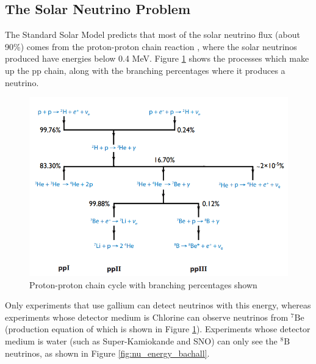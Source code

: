 \subsection{The Solar Neutrino Problem}

The Standard Solar Model predicts that most of the solar neutrino flux (about 90\%) comes from the proton-proton chain reaction \cite{borexino2018comprehensive}, where the solar neutrinos produced have energies below 0.4 MeV. Figure \ref{fig:ppchain} shows the processes which make up the pp chain, along with the branching percentages where it produces a neutrino. 

\begin{figure}
    \centering
    \includegraphics[width=\textwidth]{Figures/ppchain.png}
    \caption{Proton-proton chain cycle with branching percentages shown}
    \label{fig:ppchain}
\end{figure}

Only experiments that use gallium can detect neutrinos with this energy, whereas experiments whose detector medium is Chlorine can observe neutrinos from ${ }^{7} \mathrm{Be}$ (production equation of which is shown in Figure \ref{fig:ppchain}). Experiments whose detector medium is water (such as Super-Kamiokande and SNO) can only see the ${ }^{8} \mathrm{B}$ neutrinos, as shown in Figure \ref{fig:nu_energy_bachall}.

